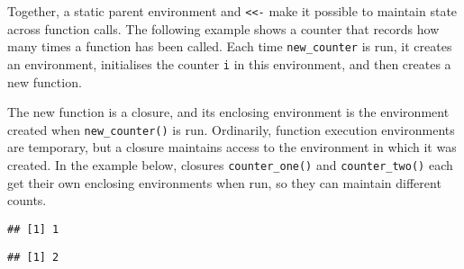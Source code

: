 Together, a static parent environment and
\texttt{\textless{}\textless{}-} make it possible to maintain state
across function calls. The following example shows a counter that
records how many times a function has been called. Each time
\texttt{new\_counter} is run, it creates an environment, initialises the
counter \texttt{i} in this environment, and then creates a new function.

\begin{Shaded}
\begin{Highlighting}[]
\StringTok{ }\NormalTok{() \{}
\StringTok{ }
  \NormalTok{() \{}
\StringTok{ }\OperatorTok{+}\StringTok{ }
\NormalTok{  \}}
\NormalTok{\}}
\end{Highlighting}
\end{Shaded}

The new function is a closure, and its enclosing environment is the
environment created when \texttt{new\_counter()} is run. Ordinarily,
function execution environments are temporary, but a closure maintains
access to the environment in which it was created. In the example below,
closures \texttt{counter\_one()} and \texttt{counter\_two()} each get
their own enclosing environments when run, so they can maintain
different counts.

\begin{Shaded}
\begin{Highlighting}[]
\StringTok{ }\NormalTok{()}
\StringTok{ }\NormalTok{()}

\NormalTok{()}
\end{Highlighting}
\end{Shaded}

\begin{verbatim}
## [1] 1
\end{verbatim}

\begin{Shaded}
\begin{Highlighting}[]
\NormalTok{()}
\end{Highlighting}
\end{Shaded}

\begin{verbatim}
## [1] 2
\end{verbatim}

